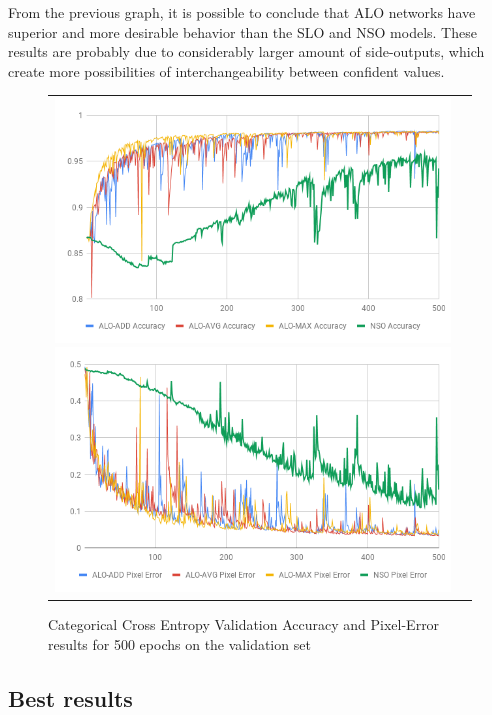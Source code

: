 From the previous graph, it is possible to conclude that ALO networks have superior and more desirable behavior than the SLO and NSO models. These results are probably due to considerably larger amount of side-outputs, which create more possibilities of interchangeability between confident values.

\begin{figure}
  \centering
  \begin{tabular}{ll}
    \includegraphics[width=1.\columnwidth]{figures/falreis/val_acc_500_epochs.png}
  
    \includegraphics[width=1.\columnwidth]{figures/falreis/pixel_error_500_epochs.png}
  \end{tabular}%
  \caption{Categorical Cross Entropy Validation Accuracy and Pixel-Error results for 500 epochs on the validation set}
  \label{fig:val_acc_500_epochs}
\end{figure}

\subsection{Best results}


